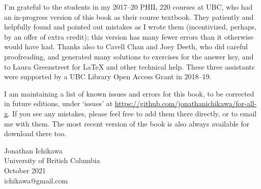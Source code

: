 I'm grateful to the students in my 2017--20 PHIL 220 courses at UBC, who had an in-progress version of this book as their course textbook. They patiently and helpfully found and pointed out mistakes as I wrote them (incentivized, perhaps, by an offer of extra credit); this version has many fewer errors than it otherwise would have had. Thanks also to Cavell Chan and Joey Deeth, who did careful proofreading, and generated many solutions to exercises for the answer key, and to Laura Greenstreet for LaTeX and other technical help. These three assistants were supported by a UBC Library Open Access Grant in 2018--19.

I am maintaining a list of known issues and errors for this book, to be corrected in future editions, under `issues' at \url{https://github.com/jonathanichikawa/for-all-x}. If you see any mistakes, please feel free to add them there directly, or to email me with them. The most recent version of the book is also always available for download there too.

\begin{flushright}
Jonathan Ichikawa \\
University of British Columbia \\
October 2021 \\
ichikawa@gmail.com
\end{flushright}

\fi
